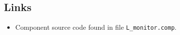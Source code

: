 \subsection*{Links}
\begin{itemize}
  \item Component source code found in file \texttt{L\_monitor.comp}.
\end{itemize}
